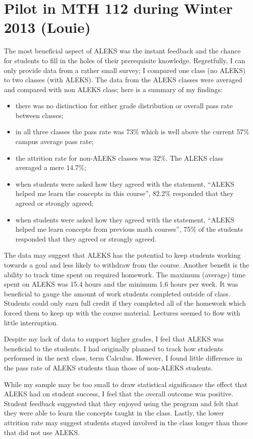 \section[MTH 112]{Pilot in MTH 112 during Winter 2013 (Louie)}
The most beneficial aspect of ALEKS was the instant feedback and the chance for students to fill in the holes of their prerequisite knowledge. Regretfully, I can only provide data from a rather small survey; I compared one class (no ALEKS) to two classes (with ALEKS). The data from the ALEKS classes were averaged and compared with non ALEKS class; here is a summary of my findings:
\begin{itemize}
	\item there was no distinction for either grade distribution or overall pass rate between classes;
	\item in all three classes the pass rate was 73\% which is well above the current 57\% campus average pass rate;
	\item the attrition rate for non-ALEKS classes was 32\%. The ALEKS class averaged a mere 14.7\%;
\item 	when students were asked how they agreed with the statement, ``ALEKS helped me learn the concepts in this course'',  82.2\% responded that they agreed or strongly agreed;
\item	when students were asked how they agreed with the statement, ``ALEKS helped me learn concepts from previous math courses'', 75\% of the students responded that they agreed or strongly agreed.
\end{itemize}
The data may suggest that ALEKS has the potential to keep students working towards a goal and less likely to withdraw from the course. Another benefit is the ability to track time spent on required homework. The maximum (average) time spent on ALEKS was 15.4 hours and the minimum 1.6 hours per week. It was beneficial to gauge the amount of work students completed outside of class. Students could only earn full credit if they completed all of the homework which forced them to keep up with the course material. Lectures seemed to flow with little interruption. 

Despite my lack of data to support higher grades, I feel that ALEKS was beneficial to the students. I had originally planned to track how students performed in the next class,  term Calculus. However, I found little difference in the pass rate of ALEKS students than those of non-ALEKS students. 

While my sample may be too small to draw statistical significance the effect that ALEKS had on student success, I feel that the overall outcome was positive. Student feedback suggested that they enjoyed using the program and felt that they were able to learn the concepts taught in the class. Lastly, the lower attrition rate may suggest students stayed involved in the class longer than those that did not use ALEKS. 